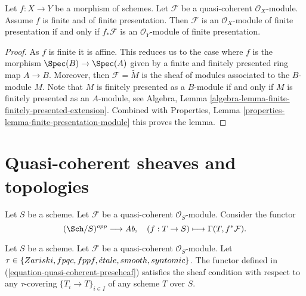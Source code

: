 \begin{lemma}
\label{lemma-finite-finitely-presented-module}
Let $f : X \to Y$ be a morphism of schemes.
Let $\mathcal{F}$ be a quasi-coherent $\mathcal{O}_X$-module.
Assume $f$ is finite and of finite presentation.
Then $\mathcal{F}$ is an $\mathcal{O}_X$-module of finite presentation
if and only if $f_*\mathcal{F}$ is an $\mathcal{O}_Y$-module of finite
presentation.
\end{lemma}

\begin{proof}
As $f$ is finite it is affine. This reduces us to the case where
$f$ is the morphism $\Spec(B) \to \Spec(A)$ given
by a finite and finitely presented ring map $A \to B$.
Moreover, then $\mathcal{F} = \widetilde{M}$ is the sheaf of modules
associated to the $B$-module $M$.
Note that $M$ is finitely presented as a $B$-module if and only if
$M$ is finitely presented as an $A$-module, see
Algebra, Lemma \ref{algebra-lemma-finite-finitely-presented-extension}.
Combined with
Properties, Lemma \ref{properties-lemma-finite-presentation-module}
this proves the lemma.
\end{proof}
















\section{Quasi-coherent sheaves and topologies}
\label{section-quasi-coherent-sheaves}


\noindent
Let $S$ be a scheme.
Let $\mathcal{F}$ be a quasi-coherent $\mathcal{O}_S$-module.
Consider the functor
\begin{equation}
\label{equation-quasi-coherent-preseheaf}
(\Sch/S)^{opp} \longrightarrow \textit{Ab},
\quad
(f : T \to S) \longmapsto \Gamma(T, f^*\mathcal{F}).
\end{equation}

\begin{lemma}
\label{lemma-sheaf-condition-holds}
Let $S$ be a scheme.
Let $\mathcal{F}$ be a quasi-coherent $\mathcal{O}_S$-module.
Let $\tau \in \{Zariski, \linebreak[0] fpqc, \linebreak[0] fppf, \linebreak[0]
\acute{e}tale, \linebreak[0] smooth, \linebreak[0] syntomic\}$.
The functor defined in (\ref{equation-quasi-coherent-preseheaf})
satisfies the sheaf condition with respect to any $\tau$-covering
$\{T_i \to T\}_{i \in I}$ of any scheme $T$ over $S$.
\end{lemma}

